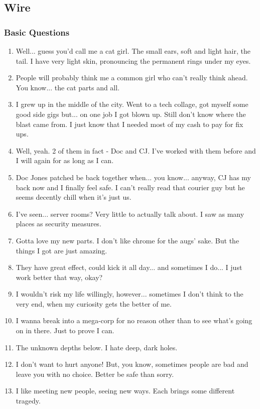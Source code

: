 \def\pfcname{Wire}
\subsection{\pfcname}
\subsubsection{Basic Questions}
\begin{enumerate}
	\setlength\itemsep{-10mm}
	\item Well... guess you'd call me a cat girl. The small ears, soft and light hair, the tail. I have very light skin, pronouncing the permanent rings under my eyes.
	\item People will probably think me a common girl who can't really think ahead. You know... the cat parts and all.
	\item I grew up in the middle of the city. Went to a tech collage, got myself some good side gigs but... on one job I got blown up. Still don't know where the blast came from. I just know that I needed most of my cash to pay for fix ups.
	\item Well, yeah. 2 of them in fact - Doc and CJ. I've worked with them before and I will again for as long as I can.
	\item Doc Jones patched be back together when... you know... anyway, CJ has my back now and I finally feel safe. I can't really read that courier guy but he seems decently chill when it's just us.
	\item I've seen... server rooms? Very little to actually talk about. I saw as many places as security measures.
	\item Gotta love my new parts. I don't like chrome for the augs' sake. But the things I got are just amazing.
	\item They have great effect, could kick it all day... and sometimes I do... I just work better that way, okay?
	\item I wouldn't risk my life willingly, however... sometimes I don't think to the very end, when my curiosity gets the better of me.
	\item I wanna break into a mega-corp for no reason other than to see what's going on in there. Just to prove I can.
	\item The unknown depths below. I hate deep, dark holes.
	\item I don't want to hurt anyone! But, you know, sometimes people are bad and leave you with no choice. Better be safe than sorry.
	\item I like meeting new people, seeing new ways. Each brings some different tragedy.

\end{enumerate}
